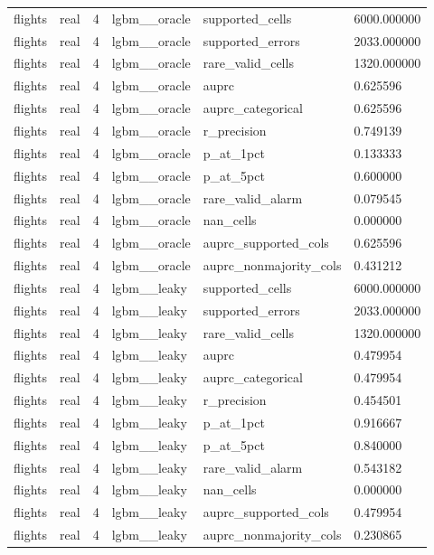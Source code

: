 \begin{tabular}{llllll}
flights & real & 4 & lgbm\_\_oracle & supported\_cells & 6000.000000 \\
flights & real & 4 & lgbm\_\_oracle & supported\_errors & 2033.000000 \\
flights & real & 4 & lgbm\_\_oracle & rare\_valid\_cells & 1320.000000 \\
flights & real & 4 & lgbm\_\_oracle & auprc & 0.625596 \\
flights & real & 4 & lgbm\_\_oracle & auprc\_categorical & 0.625596 \\
flights & real & 4 & lgbm\_\_oracle & r\_precision & 0.749139 \\
flights & real & 4 & lgbm\_\_oracle & p\_at\_1pct & 0.133333 \\
flights & real & 4 & lgbm\_\_oracle & p\_at\_5pct & 0.600000 \\
flights & real & 4 & lgbm\_\_oracle & rare\_valid\_alarm & 0.079545 \\
flights & real & 4 & lgbm\_\_oracle & nan\_cells & 0.000000 \\
flights & real & 4 & lgbm\_\_oracle & auprc\_supported\_cols & 0.625596 \\
flights & real & 4 & lgbm\_\_oracle & auprc\_nonmajority\_cols & 0.431212 \\
flights & real & 4 & lgbm\_\_leaky & supported\_cells & 6000.000000 \\
flights & real & 4 & lgbm\_\_leaky & supported\_errors & 2033.000000 \\
flights & real & 4 & lgbm\_\_leaky & rare\_valid\_cells & 1320.000000 \\
flights & real & 4 & lgbm\_\_leaky & auprc & 0.479954 \\
flights & real & 4 & lgbm\_\_leaky & auprc\_categorical & 0.479954 \\
flights & real & 4 & lgbm\_\_leaky & r\_precision & 0.454501 \\
flights & real & 4 & lgbm\_\_leaky & p\_at\_1pct & 0.916667 \\
flights & real & 4 & lgbm\_\_leaky & p\_at\_5pct & 0.840000 \\
flights & real & 4 & lgbm\_\_leaky & rare\_valid\_alarm & 0.543182 \\
flights & real & 4 & lgbm\_\_leaky & nan\_cells & 0.000000 \\
flights & real & 4 & lgbm\_\_leaky & auprc\_supported\_cols & 0.479954 \\
flights & real & 4 & lgbm\_\_leaky & auprc\_nonmajority\_cols & 0.230865 \\

\end{tabular}
